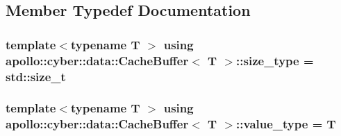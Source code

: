 \subsection{Member Typedef Documentation}
\hypertarget{classapollo_1_1cyber_1_1data_1_1CacheBuffer_aeec34cc7bc656b116ad54e5642c7f9dc}{
\subsubsection[{size\-\_\-type}]{\setlength{\rightskip}{0pt plus 5cm}template$<$typename T $>$ using {\bf apollo\-::cyber\-::data\-::\-Cache\-Buffer}$<$ T $>$\-::{\bf size\-\_\-type} =  std\-::size\-\_\-t}}\label{classapollo_1_1cyber_1_1data_1_1CacheBuffer_aeec34cc7bc656b116ad54e5642c7f9dc}
\hypertarget{classapollo_1_1cyber_1_1data_1_1CacheBuffer_a5ecd4f15649a5a8cdfe374728dfc525d}{
\subsubsection[{value\-\_\-type}]{\setlength{\rightskip}{0pt plus 5cm}template$<$typename T $>$ using {\bf apollo\-::cyber\-::data\-::\-Cache\-Buffer}$<$ T $>$\-::{\bf value\-\_\-type} =  T}}\label{classapollo_1_1cyber_1_1data_1_1CacheBuffer_a5ecd4f15649a5a8cdfe374728dfc525d}


